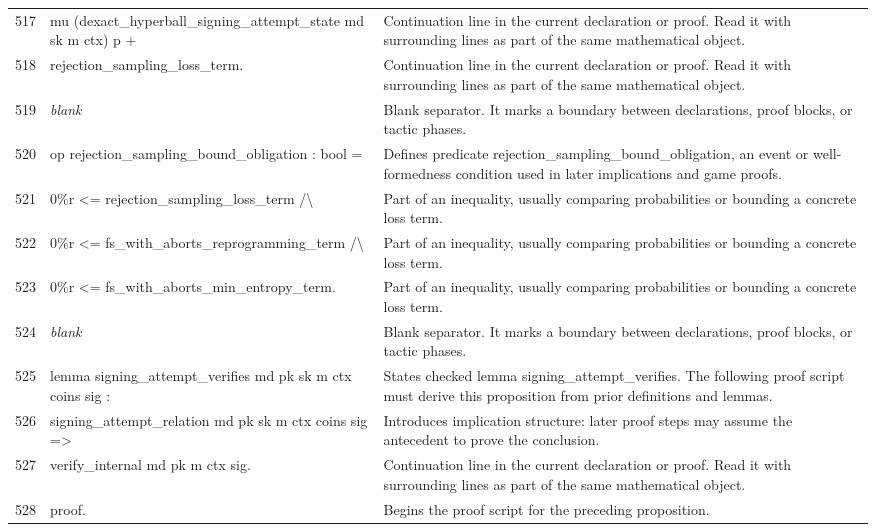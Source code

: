 \documentclass[10pt]{article}
\begin{document}
\begin{longtable}{r L{0.53\textwidth} L{0.37\textwidth}}
517 & {\ttfamily\scriptsize     mu (dexact\_hyperball\_signing\_attempt\_state md sk m ctx) p +} & Continuation line in the current declaration or proof.  Read it with surrounding lines as part of the same mathematical object. \\
518 & {\ttfamily\scriptsize       rejection\_sampling\_loss\_term.} & Continuation line in the current declaration or proof.  Read it with surrounding lines as part of the same mathematical object. \\
519 & {\ttfamily\scriptsize \emph{blank}} & Blank separator.  It marks a boundary between declarations, proof blocks, or tactic phases. \\
520 & {\ttfamily\scriptsize op rejection\_sampling\_bound\_obligation : bool =} & Defines predicate rejection\_sampling\_bound\_obligation, an event or well-formedness condition used in later implications and game proofs. \\
521 & {\ttfamily\scriptsize   0\%r <= rejection\_sampling\_loss\_term /\textbackslash{}} & Part of an inequality, usually comparing probabilities or bounding a concrete loss term. \\
522 & {\ttfamily\scriptsize   0\%r <= fs\_with\_aborts\_reprogramming\_term /\textbackslash{}} & Part of an inequality, usually comparing probabilities or bounding a concrete loss term. \\
523 & {\ttfamily\scriptsize   0\%r <= fs\_with\_aborts\_min\_entropy\_term.} & Part of an inequality, usually comparing probabilities or bounding a concrete loss term. \\
524 & {\ttfamily\scriptsize \emph{blank}} & Blank separator.  It marks a boundary between declarations, proof blocks, or tactic phases. \\
525 & {\ttfamily\scriptsize lemma signing\_attempt\_verifies md pk sk m ctx coins sig :} & States checked lemma signing\_attempt\_verifies.  The following proof script must derive this proposition from prior definitions and lemmas. \\
526 & {\ttfamily\scriptsize   signing\_attempt\_relation md pk sk m ctx coins sig =>} & Introduces implication structure: later proof steps may assume the antecedent to prove the conclusion. \\
527 & {\ttfamily\scriptsize   verify\_internal md pk m ctx sig.} & Continuation line in the current declaration or proof.  Read it with surrounding lines as part of the same mathematical object. \\
528 & {\ttfamily\scriptsize proof.} & Begins the proof script for the preceding proposition. \\

\end{longtable}
\end{document}
